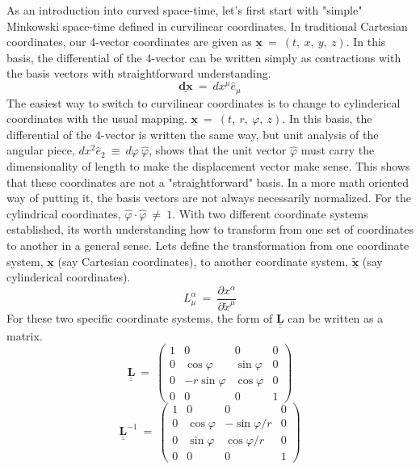 \hskip 25pt As an introduction into curved space-time, let's first start with "simple" Minkowski space-time defined in
curvilinear coordinates.  In traditional Cartesian coordinates, our 4-vector coordinates are given as
$\underline{\mathbf{x}}\ =\ (t,\ x,\ y,\ z)$.  In this basis, the differential of the 4-vector can be written simply as
contractions with the basis vectors with straightforward understanding.
\begin{equation}
  \underline{\mathbf{dx}}\ =\ dx^{\mu}\hat{e}_{\mu}
\end{equation}
The easiest way to switch to curvilinear coordinates is to change to cylinderical coordinates with the usual mapping.  
$\underline{\mathbf{x}}\ =\ (t,\ r,\ \varphi,\ z)$.  In this basis, the differential of the 4-vector is written the same
way, but unit analysis of the angular piece, $dx^2\hat{e}_2\ \equiv\ d\varphi\ \widehat{\varphi}$, shows that the unit vector
$\widehat{\varphi}$ must carry the dimensionality of length to make the displacement vector make sense.  This shows that these
coordinates are not a "straightforward" basis.  In a more math oriented way of putting it, the basis vectors are not
always necessarily normalized.  For the cylindrical coordinates, $\widehat{\varphi}\cdot\widehat{\varphi}\ \neq\ 1$.  With
two different coordinate systems established, its worth understanding how to transform from one set of coordinates to
another in a general sense.  Lets define the transformation from one coordinate system, $\underline{\mathbf{x}}$
(say Cartesian coordinates), to another coordinate system, $\underline{\widetilde{\mathbf{x}}}$ (say cylinderical coordinates).
\begin{equation}
  L^{\alpha}_{\mu}\ =\ \frac{\partial x^{\alpha}}{\partial\tilde{x}^{\mu}}
\end{equation}
For these two specific coordinate systems, the form of $\underline{\underline{\mathbf{L}}}$ can be written as a matrix.
\begin{equation}
  \underline{\underline{\mathbf{L}}}\ =\
  \begin{pmatrix}
    1 & 0 & 0 & 0 \\
    0 & \cos\varphi & \sin\varphi & 0 \\
    0 & -r\sin\varphi & \cos\varphi & 0 \\
    0 & 0 & 0 & 1 
  \end{pmatrix}
\end{equation}
\begin{equation}
  \underline{\underline{\mathbf{L}}}^{-1}\ =\
  \begin{pmatrix}
    1 & 0 & 0 & 0 \\
    0 & \cos\varphi & -\sin\varphi/r & 0 \\
    0 & \sin\varphi & \cos\varphi/r & 0 \\
    0 & 0 & 0 & 1 
  \end{pmatrix}
\end{equation}
